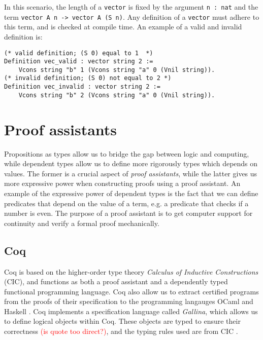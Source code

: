 In this scenario, the length of a \lstinline{vector} is fixed by the argument \lstinline{n : nat}
and the term \lstinline{vector A n -> vector A (S n)}.
Any definition of a \lstinline{vector} must adhere to this term, and is checked at compile time.
An example of a valid and invalid definition is:

\begin{minipage}{\linewidth}
\begin{lstlisting}[language=Coq, label={lst:dep_type_vec_ex}, caption={Examples of vectors in Coq}]
(* valid definition; (S 0) equal to 1  *)
Definition vec_valid : vector string 2 :=
    Vcons string "b" 1 (Vcons string "a" 0 (Vnil string)).
(* invalid definition; (S 0) not equal to 2 *)
Definition vec_invalid : vector string 2 :=
    Vcons string "b" 2 (Vcons string "a" 0 (Vnil string)).
\end{lstlisting}
\end{minipage}

\section{Proof assistants}

Propositions as types allow us to bridge the gap between logic and computing,
while dependent types allow us to define more rigorously types which depends on values.
The former is a crucial aspect of \textit{proof assistants}, while the latter gives
us more expressive power when constructing proofs using a proof assistant.
An example of the expressive power of dependent types is the fact that we can define
predicates that depend on the value of a term, e.g. a predicate that checks if a number is even.
The purpose of a proof assistant is to get computer support for continuity and verify a formal proof mechanically.

\subsection{Coq}
Coq is based on the higher-order type theory \textit{Calculus of Inductive Constructions} (CIC), and
functions as both a proof assistant and a dependently typed functional programming language.
Coq also allow us to extract certified programs from the proofs of their specification to
the programming langauges OCaml and Haskell \cite{cintro}.
Coq implements a specification language called \textit{Gallina},
which allows us to define logical objects within Coq.
These objects are typed to ensure their correctness \textcolor{red}{(is quote too direct?)},
and the typing rules used are from CIC \cite{cic}.

